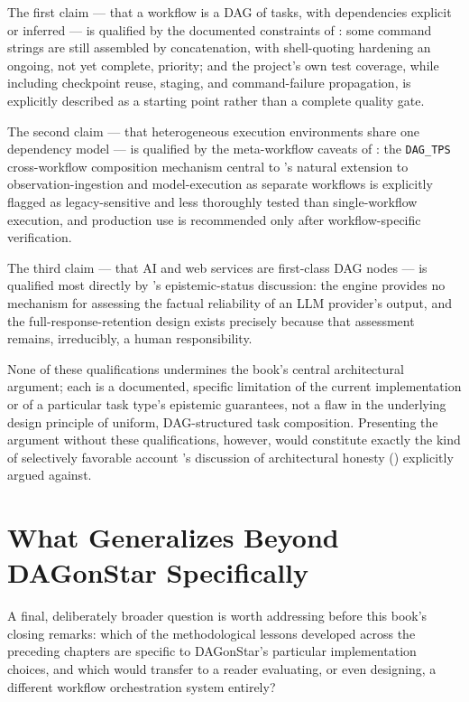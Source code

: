 The first claim --- that a workflow is a DAG of tasks, with dependencies
explicit or inferred --- is qualified by the documented constraints of
: some command strings are still assembled by
concatenation, with shell-quoting hardening an ongoing, not yet complete,
priority; and the project's own test coverage, while including checkpoint
reuse, staging, and command-failure propagation, is explicitly described as
a starting point rather than a complete quality gate.

The second claim --- that heterogeneous execution environments share one
dependency model --- is qualified by the meta-workflow caveats of
: the \texttt{DAG\_TPS} cross-workflow composition
mechanism central to 's natural extension to
observation-ingestion and model-execution as separate workflows is
explicitly flagged as legacy-sensitive and less thoroughly tested than
single-workflow execution, and production use is recommended only after
workflow-specific verification.

The third claim --- that AI and web services are first-class DAG nodes ---
is qualified most directly by 's epistemic-status
discussion: the engine provides no mechanism for assessing the factual
reliability of an LLM provider's output, and the full-response-retention
design exists precisely because that assessment remains, irreducibly, a
human responsibility.

\begin{cautionbox}
None of these qualifications undermines the book's central architectural
argument; each is a documented, specific limitation of the current
implementation or of a particular task type's epistemic guarantees, not a
flaw in the underlying design principle of uniform, DAG-structured task
composition. Presenting the argument without these qualifications, however,
would constitute exactly the kind of selectively favorable account
's discussion of architectural honesty
() explicitly argued against.
\end{cautionbox}

\section{What Generalizes Beyond DAGonStar Specifically}

A final, deliberately broader question is worth addressing before this
book's closing remarks: which of the methodological lessons developed
across the preceding chapters are specific to DAGonStar's particular
implementation choices, and which would transfer to a reader evaluating, or
even designing, a different workflow orchestration system entirely?

